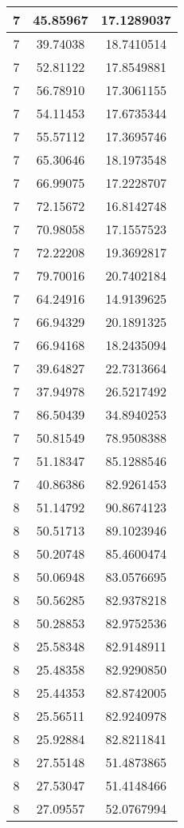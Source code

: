 \documentclass[
]{book}
\begin{document}
\begin{tabular}{c|c|c}
\hline
7 & 45.85967 & 17.1289037\\
\hline
7 & 39.74038 & 18.7410514\\
\hline
7 & 52.81122 & 17.8549881\\
\hline
7 & 56.78910 & 17.3061155\\
\hline
7 & 54.11453 & 17.6735344\\
\hline
7 & 55.57112 & 17.3695746\\
\hline
7 & 65.30646 & 18.1973548\\
\hline
7 & 66.99075 & 17.2228707\\
\hline
7 & 72.15672 & 16.8142748\\
\hline
7 & 70.98058 & 17.1557523\\
\hline
7 & 72.22208 & 19.3692817\\
\hline
7 & 79.70016 & 20.7402184\\
\hline
7 & 64.24916 & 14.9139625\\
\hline
7 & 66.94329 & 20.1891325\\
\hline
7 & 66.94168 & 18.2435094\\
\hline
7 & 39.64827 & 22.7313664\\
\hline
7 & 37.94978 & 26.5217492\\
\hline
7 & 86.50439 & 34.8940253\\
\hline
7 & 50.81549 & 78.9508388\\
\hline
7 & 51.18347 & 85.1288546\\
\hline
7 & 40.86386 & 82.9261453\\
\hline
8 & 51.14792 & 90.8674123\\
\hline
8 & 50.51713 & 89.1023946\\
\hline
8 & 50.20748 & 85.4600474\\
\hline
8 & 50.06948 & 83.0576695\\
\hline
8 & 50.56285 & 82.9378218\\
\hline
8 & 50.28853 & 82.9752536\\
\hline
8 & 25.58348 & 82.9148911\\
\hline
8 & 25.48358 & 82.9290850\\
\hline
8 & 25.44353 & 82.8742005\\
\hline
8 & 25.56511 & 82.9240978\\
\hline
8 & 25.92884 & 82.8211841\\
\hline
8 & 27.55148 & 51.4873865\\
\hline
8 & 27.53047 & 51.4148466\\
\hline
8 & 27.09557 & 52.0767994\\

\end{tabular}
\end{document}
